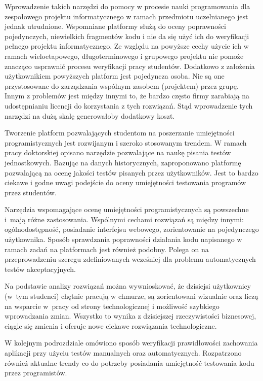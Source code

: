 Wprowadzenie takich narzędzi do pomocy w procesie nauki programowania dla zespołowego projektu informatycznego w ramach przedmiotu uczelnianego jest jednak utrudnione.
Wspomniane platformy służą do oceny poprawności pojedynczych, niewielkich fragmentów kodu i nie da się użyć ich do weryfikacji pełnego projektu informatycznego.
Ze względu na powyższe cechy użycie ich w ramach wieloetapowego, długoterminowego i grupowego projektu nie pomoże znacząco usprawnić procesu weryfikacji pracy studentów.
Dodatkowo z założenia użytkownikiem powyższych platform jest pojedyncza osoba.
Nie są one przystosowane do zarządzania wspólnym zasobem (projektem) przez grupę.
Innym z problemów jest między innymi to, że bardzo często firmy zarabiają na udostępnianiu licencji do korzystania z tych rozwiązań.
Stąd wprowadzenie tych narzędzi na dużą skalę generowałoby dodatkowy koszt.

Tworzenie platform pozwalających studentom na poszerzanie umiejętności programistycznych jest rozwijanym i szeroko stosowanym trendem.
W ramach pracy doktorskiej \cite{teach-testing-thesis} opisano narzędzie pozwalające na naukę pisania testów jednostkowych.
Bazując na danych historycznych, zaproponowano platformę pozwalającą na ocenę jakości testów pisanych przez użytkowników.
Jest to bardzo ciekawe i godne uwagi podejście do oceny umiejętności testowania programów przez studentów.

Narzędzia wspomagające ocenę umiejętności programistycznych są powszechne i~mają różne zastosowania.
Wspólnymi cechami rozwiązań są między innymi: ogólnodostępność, posiadanie interfejsu webowego, zorientowanie na pojedynczego użytkownika.
Sposób sprawdzania poprawności działania kodu napisanego w ramach zadań na platformach jest również podobny.
Polega on na przeprowadzeniu szeregu zdefiniowanych wcześniej dla problemu automatycznych testów akceptacyjnych.

Na podstawie analizy rozwiązań można wywnioskować, że dzisiejsi użytkownicy (w~tym studenci) chętnie pracują w chmurze, są zorientowani wizualnie oraz liczą na wsparcie w~pracy od strony technologicznej i możliwość szybkiego wprowadzania zmian.
Wszystko to wynika z dzisiejszej rzeczywistości biznesowej, ciągle się zmienia i oferuje nowe ciekawe rozwiązania technologiczne.

W kolejnym podrozdziale omówiono sposób weryfikacji prawidłowości zachowania aplikacji przy użyciu testów manualnych oraz automatycznych.
Rozpatrzono również aktualne trendy co do potrzeby posiadania umiejętność testowania kodu przez programistów.

